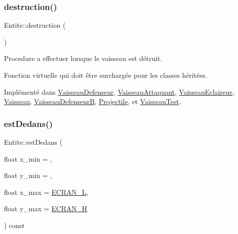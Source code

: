 \subsubsection{\texorpdfstring{destruction()}{destruction()}}
{\footnotesize\ttfamily Entite\+::destruction (\begin{DoxyParamCaption}{ }\end{DoxyParamCaption})\hspace{0.3cm}{\ttfamily [pure virtual]}}



Procedure a effectuer lorsque le vaisseau est détruit. 

Fonction virtuelle qui doit être surchargée pour les classes héritées. 

Implémenté dans \hyperlink{class_vaisseau_defenseur_a6816d325d737269cddc6310e7f68b222}{Vaisseau\+Defenseur}, \hyperlink{class_vaisseau_attaquant_af804e1fd491301c2385e10d88f4892a6}{Vaisseau\+Attaquant}, \hyperlink{class_vaisseau_eclaireur_a4f65343b67301d7fa98f5e02337cc1e1}{Vaisseau\+Eclaireur}, \hyperlink{class_vaisseau_af4f490c5fd9e171b23067ec73aa737ad}{Vaisseau}, \hyperlink{class_vaisseau_defenseur_b_aba88319dcc7540dce39c164fa9853732}{Vaisseau\+DefenseurB}, \hyperlink{class_projectile_aac0afd5bf761f0e212d4e1c8a503c86a}{Projectile}, et \hyperlink{class_vaisseau_test_a5b8b67886ecb73d8f720f8499ef3c378}{Vaisseau\+Test}.

\mbox{\label{class_entite_a0861182f1af724c8b5fd70b30720fa04}} 
\subsubsection{\texorpdfstring{est\+Dedans()}{estDedans()}}
{\footnotesize\ttfamily Entite\+::est\+Dedans (\begin{DoxyParamCaption}\item[{float}]{x\+\_\+min = {},  }\item[{float}]{y\+\_\+min = {},  }\item[{float}]{x\+\_\+max = {\ttfamily \hyperlink{constantes_8h_a078285dfdd5f8d9caa79aeb3f4eb0a1f}{E\+C\+R\+A\+N\+\_\+L}},  }\item[{float}]{y\+\_\+max = {\ttfamily \hyperlink{constantes_8h_a75c426da06c2ec9164baaf36a262fa07}{E\+C\+R\+A\+N\+\_\+H}} }\end{DoxyParamCaption}) const}




